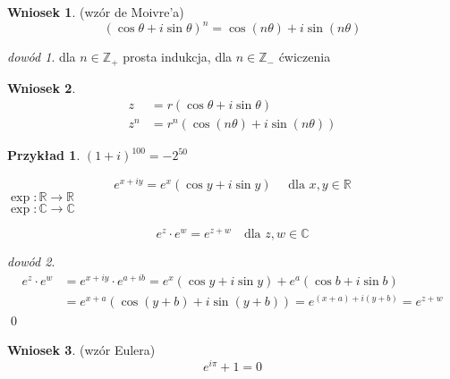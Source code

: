 \documentclass[10pt]{article}
\theoremstyle{definition}
\theoremstyle{definition}
\theoremstyle{definition}
\theoremstyle{definition}
\theoremstyle{remark}
\newtheorem*{dd}{dowód}
\theoremstyle{definition}
\theoremstyle{definition}
\newtheorem*{wn}{Wniosek}
\theoremstyle{definition}
\theoremstyle{definition}
\newtheorem*{prz}{Przykład}
\theoremstyle{definition}
\begin{document}
\begin{wn} (wzór de Moivre'a) 
    \[ (\cos\theta + i\sin\theta)^n = \cos(n\theta) + i\sin(n\theta) \]  
\end{wn}
\begin{dd} 
    dla $n \in \mathbb{Z}_+$ prosta indukcja,
    dla $n \in \mathbb{Z}_-$ ćwiczenia 
\end{dd} 
\begin{wn}
    \begin{align*}
        z &= r(\cos\theta + i\sin\theta) \\
        z^n &= r^n(\cos(n\theta)+i\sin(n\theta))
    \end{align*}
\end{wn} 
\begin{prz}
    $(1+i)^{100} = -2^{50}$
\end{prz}

\begin{df} 
    \[ e^{x+iy} = e^x(\cos y + i\sin y) \quad \text{ dla } x,y \in \mathbb{R} \] 
    $ \exp: \mathbb{R} \to \mathbb{R} $ \\ 
    $\exp : \mathbb{C} \to \mathbb{C} $
\end{df}
\begin{ft} 
    \[ e^z \cdot e^w = e^{z+w} \quad \text{dla }z,w \in \mathbb{C} \]
\end{ft}
\begin{dd} 
    \begin{align*}
         e^z \cdot e^w &= e^{x +iy} \cdot e^{a + ib} = e^x(\cos y + i \sin y) + e^a(\cos b + i\sin b) \\ 
    &= e^{x+a}(\cos(y+b) + i\sin(y+b)) = e^{(x+a) + i(y+b)} = e^{z+w}  
    \end{align*}
    \hfill \qed
\end{dd} 
\begin{wn} (wzór Eulera) \[ e^{i\pi} + 1 = 0 \] \end{wn}
\end{document}
